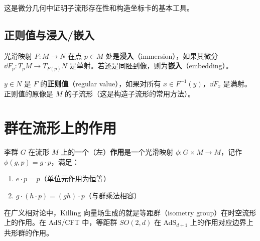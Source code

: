 这是微分几何中证明子流形存在性和构造坐标卡的基本工具。

\subsection{正则值与浸入/嵌入}

光滑映射 $F: M \to N$ 在点 $p \in M$ 处是\textbf{浸入}（immersion），如果其微分 $\dd F_p: T_pM \to T_{F(p)}N$ 是单射。若还是同胚到像，则为\textbf{嵌入}（embedding）。

$y \in N$ 是 $F$ 的\textbf{正则值}（regular value），如果对所有 $x \in F^{-1}(y)$，$\dd F_x$ 是满射。正则值的原像是 $M$ 的子流形（这是构造子流形的常用方法）。

\section{群在流形上的作用}

李群 $G$ 在流形 $M$ 上的一个（左）\textbf{作用}是一个光滑映射 $\phi: G \times M \to M$，记作 $\phi(g, p) = g \cdot p$，满足：
\begin{enumerate}
    \item $e \cdot p = p$（单位元作用为恒等）
    \item $g \cdot (h \cdot p) = (gh) \cdot p$（与群乘法相容）
\end{enumerate}

在广义相对论中，Killing 向量场生成的就是等距群（isometry group）在时空流形上的作用。在 AdS/CFT 中，等距群 $SO(2,d)$ 在 AdS$_{d+1}$ 上的作用对应边界上共形群的作用。
